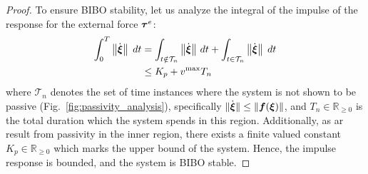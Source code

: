 \iflong
\begin{proof}
To ensure BIBO stability, let us analyze the integral of the impulse of the response for the external force $\boldsymbol{\tau}^e$: 
\begin{equation}
	\begin{split}
	  \int_{0}^{T} \left\| \dot{\boldsymbol{\xi}} \right\| \; dt 
	  & = \int_{t \notin \mathcal{T}_n} \left\| \dot {\boldsymbol{\xi}} \right\|  \, dt + \int_{t \in  \mathcal{T}_n} \left\| \dot {\boldsymbol{\xi}} \right\| \;  dt \\ 
	  & \leq K_p + v^{\mathrm{max}} T_n
\end{split}
\label{eq:bibo_velocity}
\end{equation}
where $\mathcal{T}_n$ denotes the set of time instances where the system is not shown to be passive (Fig.~\ref{fig:passivity_analysis}), specifically $\| \dot{\boldsymbol{\xi}} \| \leq \| \boldsymbol{f} (\boldsymbol{\xi}) \|$, and $T_n \in \mathbb{R}_{\geq 0}$ is the total duration which the system spends in this region. Additionally, as ar result from passivity in the inner region, there exists a finite valued constant $K_p \in \mathbb{R}_{\geq 0}$ which marks the upper bound of the system.
Hence, the impulse response is bounded, and the system is BIBO stable.


\end{proof}
